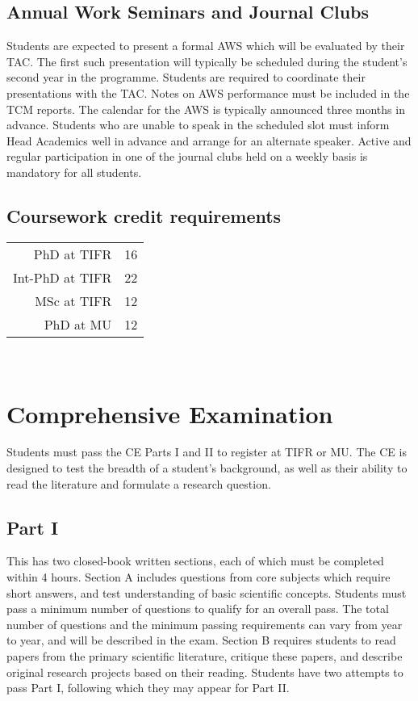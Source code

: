 \documentclass[a4paper]{extarticle}
\begin{document}
\subsection{Annual Work Seminars and Journal Clubs}
Students are expected to present a formal AWS
which will be evaluated by their TAC. The first such presentation will typically
be scheduled during the student's second year in the programme. Students are
required to coordinate their presentations with the TAC. Notes on AWS
performance must be included in the TCM reports. The calendar for the AWS is
typically announced three months in advance. Students who are unable to speak in
the scheduled slot must inform Head Academics well in advance and arrange for an
alternate speaker. Active and regular participation in one of the journal clubs
held on a weekly basis is mandatory for all students. 

\subsection{Coursework credit requirements}

\begin{tabular}{r l}
PhD at TIFR & 16 \\
Int-PhD at TIFR & 22 \\
MSc at TIFR & 12 \\
PhD at MU & 12
\end{tabular} \newline
  

 \section{Comprehensive Examination}

Students must pass the CE Parts I and II to register at TIFR or MU. The CE is designed to
test the breadth of a student’s background, as well as their ability to read the literature and
formulate a research question.

\subsection{Part I} This has two closed-book written sections, each of which
must be completed within 4 hours. Section A includes questions from core
subjects which require short answers, and test understanding of basic scientific
concepts. Students must pass a minimum number of questions to qualify for an
overall pass. The total number of questions and the minimum passing requirements
can vary from year to year, and will be described in the exam. Section B
requires students to read papers from the primary scientific literature,
critique these papers, and describe original research projects based on their
reading. Students have two attempts to pass Part I, following which they may
appear for Part II.
\end{document}
